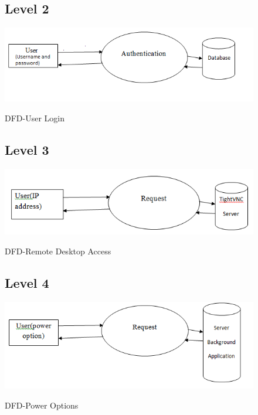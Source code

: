 \begin{figure}
\subsection{Level 2}
\label{Level 2}
\begin{center}
\scalebox{0.70}
{\includegraphics{login2.png}}
\caption{DFD-User Login}  
\end{center}
\end{figure}


\begin{figure}
\subsection{Level 3}
\label{Level 3} 
\begin{center}
\scalebox{0.70}
{\includegraphics{f3.png}}
\caption{DFD-Remote Desktop Access} 
\end{center}
\end{figure}


\begin{figure}
\subsection{Level 4}
\label{Level 4}
\begin{center}
\scalebox{0.70}
{\includegraphics{power1.png}}
\caption{DFD-Power Options}  
\end{center}
\end{figure}


